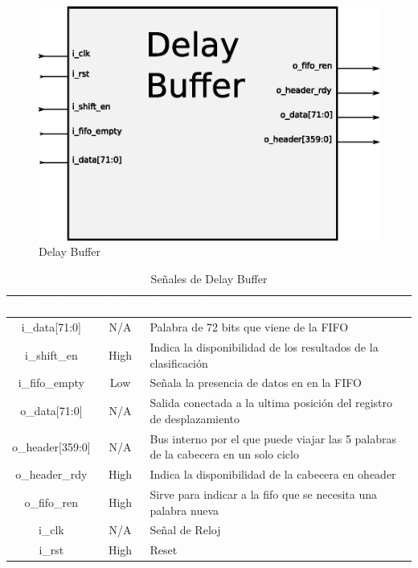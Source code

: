 \begin{figure}[H]
  \centering
	\includegraphics[scale=0.60]{3-arquitectura/graf/bloqdelaybuffer.eps}
  \caption{Delay Buffer}
  \label{fig:dbuffer}
\end{figure}


\begin{table}
	\begin{tabular}{|c|c|p{9cm}|} \hline
\rowcolor[gray]{0.1} \textcolor{white}{Nombre} & \textcolor{white}{Activo} & \textcolor{white}{Descripción}\\ \hline
\rowcolor[gray]{0.75} i\_data[71:0]	& N/A & Palabra de 72 bits que viene de la FIFO\\ \hline
\rowcolor[gray]{0.75} i\_shift\_en & High & Indica la disponibilidad de los resultados de la clasificación\\ \hline
\rowcolor[gray]{0.75} i\_fifo\_empty & Low & Señala la presencia de datos en en la FIFO\\ \hline
\rowcolor[gray]{0.9} o\_data[71:0] & N/A & Salida conectada a la ultima posición del registro de desplazamiento\\ \hline
\rowcolor[gray]{0.9} o\_header[359:0] & N/A & Bus interno por el que puede viajar las 5 palabras de la cabecera en un solo ciclo\\ \hline
\rowcolor[gray]{0.9} o\_header\_rdy & High & Indica la disponibilidad de la cabecera en oheader \\ \hline
\rowcolor[gray]{0.9} o\_fifo\_ren & High & Sirve para indicar a la fifo que se necesita una palabra nueva\\ \hline
 i\_clk & N/A & Señal de Reloj\\ \hline
 i\_rst & High & Reset\\ \hline
	\end{tabular}
	\caption{Señales de Delay Buffer}
	\label{tab:sigdb}
\end{table}


